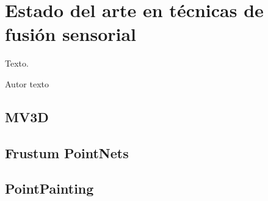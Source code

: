 \chapter{Estado del arte en técnicas de fusión sensorial}
\label{cha:Estado del arte en técnicas de fusión sensorial}

\begin{FraseCelebre}
  \begin{Frase}
    Texto.
  \end{Frase}
  \begin{Fuente}
    Autor texto
  \end{Fuente}
\end{FraseCelebre}

\section{MV3D}
\label{sec:MV3D}

\section{Frustum PointNets}
\label{sec:Frustum PointNets}

\section{PointPainting}
\label{sec:PointPainting}
